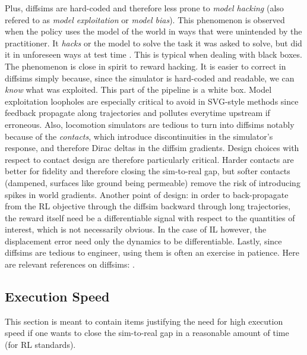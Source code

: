 \documentclass[12pt,a4paper]{article}
\begin{document}
Plus, diffsims are hard-coded and therefore less prone to \textit{model hacking} (also refered
to as \textit{model exploitation} or \textit{model bias}).
This phenomenon is observed when the policy uses the model of the world in ways that were
unintended by the practitioner. It \textit{hacks} or  the model to solve the task
it was asked to solve, but did it in unforeseen ways at test time
\cite{Ross2012-yj}.
This is typical when dealing with black boxes.
The phenomenon is close in spirit to reward hacking.
It is easier to correct in diffsims simply because, since the simulator is hard-coded and readable,
we can \textit{know} what was exploited. This part of the pipeline is a white box.
Model exploitation loopholes are especially critical to avoid in SVG-style methods since
feedback propagate along trajectories and pollutes everytime upstream if erroneous.
Also, locomotion simulators are tedious to turn into diffsims notably because of the
\emph{contacts}, which introduce discontinuities in the simulator's response, and therefore
Dirac deltas in the diffsim gradients.
Design choices with respect to contact design are therefore particularly critical.
Harder contacts are better for fidelity and therefore closing the sim-to-real gap,
but softer contacts (dampened, surfaces like ground being permeable) remove the risk of introducing
spikes in world gradients.
Another point of design: in order to back-propagate from the RL objective through the diffsim
backward through long trajectories, the reward itself need be a differentiable signal
with respect to the quantities of interest, which is not necessarily obvious.
In the case of IL however, the displacement error need only the dynamics to be differentiable.
Lastly, since diffsims are tedious to engineer, using them is often an exercise in patience.
Here are relevant references on diffsims:
\cite{Degrave2016-vr, Hu2019-ax, Falisse2019-ge, Hu2020-eb, Qiao2020-um, Gradu2020-kq,
Geilinger2020-ar, Mora2021-pp, Heiden2021-fb, Clarke2021-rr, Werling2021-da, Qiao2021-zn,
Huang2021-le, Heiden2021-ey, Grinsztajn2021-mr, Daniel_Freeman2021-az, Lin2022-jr, Xu2022-bz,
Suh2022-mn, Allen2022-vc, Chen2022-zd, Ren2023-yc, Georgiev2024-rs}.

\subsection{Execution Speed}
\label{ss:speed}

This section is meant to contain items justifying the need for high execution speed if one wants
to close the sim-to-real gap in a reasonable amount of time (for RL standards).
\end{document}
